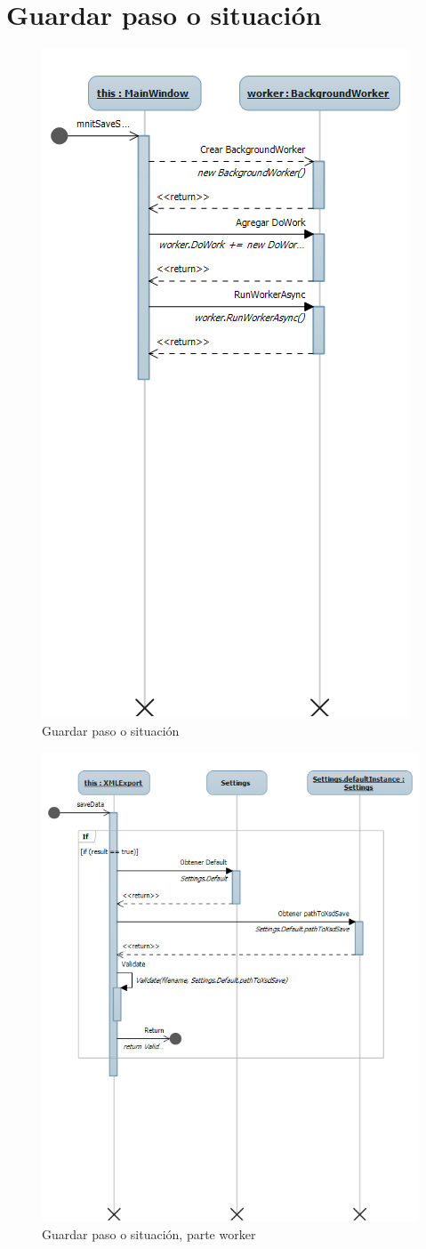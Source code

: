 \section{Guardar paso o situaci\'on}
\begin{figure}[H]
\centering
\includegraphics[width=0.7\linewidth]{./Figures/Secuencia/SaveStepSituation}
\caption{Guardar paso o situaci\'on}
\label{fig:SaveStepSituation}
\end{figure}

\begin{figure}[H]
\centering
\includegraphics[width=0.7\linewidth]{./Figures/Secuencia/XMLExportSaveData}
\caption{Guardar paso o situaci\'on, parte worker}
\label{fig:XMLExportSaveData}
\end{figure}

